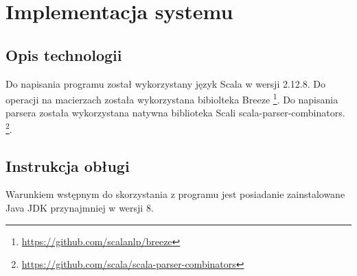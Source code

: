 \chapter{Implementacja systemu}
\thispagestyle{chapterBeginStyle}
\label{rozdzial3}

\section{Opis technologii}
Do napisania programu został wykorzystany język Scala w wersji 2.12.8. Do operacji na macierzach została wykorzystana bibiolteka Breeze \footnote{\url{https://github.com/scalanlp/breeze}}. Do napisania parsera została wykorzystana natywna biblioteka Scali scala-parser-combinators.
\footnote{\url{https://github.com/scala/scala-parser-combinators}}.
\section{Instrukcja obługi}
Warunkiem wstępnym do skorzystania z programu jest posiadanie zainstalowane Java JDK przynajmniej w wersji 8.